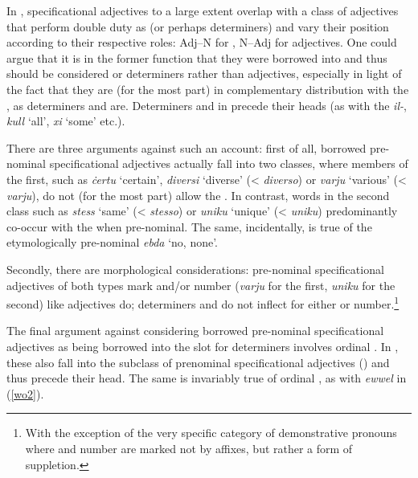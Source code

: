 \documentclass[output=paper]{langsci/langscibook}
\begin{document}
In , specificational adjectives to a large extent overlap with a class of adjectives that perform double duty as  (or perhaps determiners) and vary their position according to their respective roles: Adj--N for , N--Adj for adjectives. One could argue that it is in the former function that they were borrowed into  and thus should be considered  or determiners rather than adjectives, especially in light of the fact that they are (for the most part) in complementary distribution with the  , as determiners and  are. Determiners and  in  precede their heads (as with the   \textit{il-}, \textit{kull} `all', \textit{xi} `some' etc.).

There are three arguments against such an account: first of all, borrowed pre-nominal specificational adjectives actually fall into two classes, where members of the first, such as \textit{ċertu} `certain', \textit{diversi} `diverse' (<  \textit{diverso}) or \textit{varju} `various' (<  \textit{varju}), do not (for the most part) allow the  . In contrast, words in the second class such as \textit{stess} `same' (<  \textit{stesso}) or \textit{uniku} `unique' (<  \textit{uniku}) predominantly co-occur with the   when pre-nominal. The same, incidentally, is true of the etymologically  pre-nominal  \textit{ebda} `no, none'.

Secondly, there are morphological considerations: pre-nominal specificational adjectives of both types mark  and/or number (\textit{varju} for the first, \textit{uniku} for the second) like  adjectives do;  determiners and  do not inflect for either  or number.\footnote{With the exception of the very specific category of demonstrative pronouns where  and number are marked not by affixes, but rather a form of suppletion.}

The final argument against considering borrowed pre-nominal specificational adjectives as being borrowed into the slot for determiners involves ordinal . In , these also fall into the subclass of prenominal specificational adjectives (\citealt[55]{italian2007}) and thus precede their head. The same is invariably true of  ordinal , as with \textit{ewwel} in (\ref{wo2}).
\end{document}
